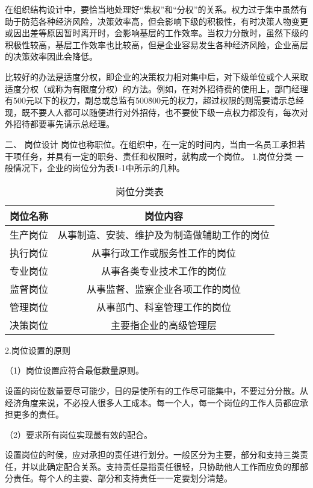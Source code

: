 \documentclass[CJK]{z-article}
\begin{document}
    在组织结构设计中，要恰当地处理好“集权”和“分权”的关系。权力过于集中虽然有助于防范各种经济风险，决策效率高，但会影响下级的积极性，有时决策人物变更或因出差等原因暂时离开时，会影响基层的工作效率。当权力分散时，虽然下级的积极性较高，基层工作效率也比较高，但是企业容易发生各种经济风险，企业高层的决策效率因此会降低。

    比较好的办法是适度分权，即企业的决策权力相对集中后，对下级单位或个人采取适度分权（或称为有限度分权）的方法。例如，在对外招待费的使用上，部门经理有500元以下的权力，副总或总监有500\~800元的权力，超过权限的则需要请示总经现，既不要人人都可以随便进行对外招侍，也不要使下级一点权力都没有，每次对外招待都要事先请示总经理。

二、 岗位设计
    岗位也称职位。在组织中，在一定的时间内，当由一名员工承担若干项任务，并具有一定的职务、责任和权限时，就构成一个岗位。
    1.岗位分类
    一般情况下，企业的岗位分为表1-1中所示的几种。
    \begin{table}
		\centering
        \caption{岗位分类表}
        \begin{tabular}{c|c}
            \hline  岗位名称&岗位内容 \\
            \hline  生产岗位&从事制造、安装、维护及为制造做辅助工作的岗位 \\
            \hline  执行岗位&从事行政工作或服务性工作的岗位 \\
            \hline  专业岗位&从事各类专业技术工作的岗位 \\
            \hline  监督岗位&从事监督、监察企业各项工作的岗位 \\
            \hline  管理岗位&从事部门、科室管理工作的岗位 \\
            \hline  决策岗位&主要指企业的高级管理层 \\
            \hline
        \end{tabular}
    \end{table}

    2.岗位设置的原则

    （1）岗位设置应符合最低数量原则。

    设置的岗位数量要尽可能少，目的是使所有的工作尽可能集中，不要过分分散。从经济角度来说，不必投人很多人工成本。每一个人，每一个岗位的工作人员都应承担更多的责任。

    （2）要求所有岗位实现最有效的配合。

    设置岗位的时侯，应对承担的责任进行划分。一般区分为主要，部分和支持三类责任，并以此确定配合关系。支持责任是指责任很轻，只协助他人工作而应负的那部分责任。每个人的主要、部分和支持责任一一定要划分清楚。
\end{document}
